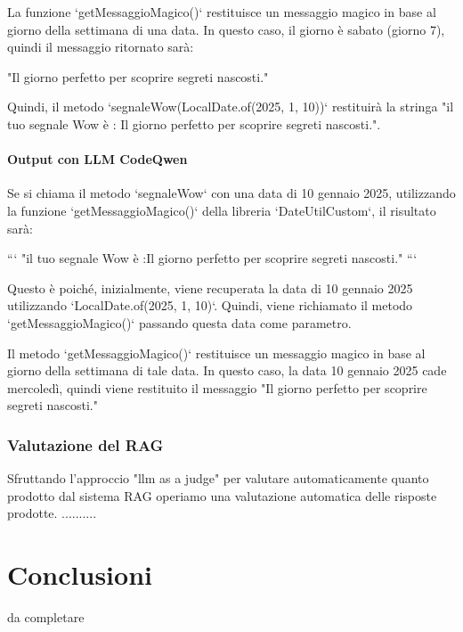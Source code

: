 \documentclass[12pt,a4paper,openright,twoside]{book}
\begin{document}
La funzione `getMessaggioMagico()` restituisce un messaggio magico in base al giorno della settimana di una data. In questo caso, il giorno è sabato (giorno 7), quindi il messaggio ritornato sarà:

"Il giorno perfetto per scoprire segreti nascosti."

Quindi, il metodo `segnaleWow(LocalDate.of(2025, 1, 10))` restituirà la stringa "il tuo segnale Wow è : Il giorno perfetto per scoprire segreti nascosti.".

\subsubsection{Output con LLM CodeQwen}
Se si chiama il metodo `segnaleWow` con una data di 10 gennaio 2025, utilizzando la funzione `getMessaggioMagico()` della libreria `DateUtilCustom`, il risultato sarà:       

```
"il tuo segnale Wow è :Il giorno perfetto per scoprire segreti nascosti."
```

Questo è poiché, inizialmente, viene recuperata la data di 10 gennaio 2025 utilizzando `LocalDate.of(2025, 1, 10)`. Quindi, viene richiamato il metodo `getMessaggioMagico()` 
passando questa data come parametro.

Il metodo `getMessaggioMagico()` restituisce un messaggio magico in base al giorno della settimana di tale data. In questo caso, la data 10 gennaio 2025 cade mercoledì, quindi viene restituito il messaggio "Il giorno perfetto per scoprire segreti nascosti."

\subsection{Valutazione del RAG}
Sfruttando l'approccio "llm as a judge" per valutare automaticamente quanto prodotto dal sistema RAG
operiamo una valutazione automatica delle risposte prodotte.
..........

\chapter{Conclusioni}

da completare
\end{document}
